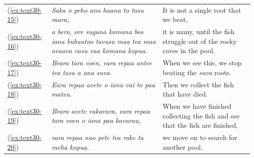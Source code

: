 \documentclass[output=paper]{langscibook}
\begin{document}
\begin{xltabular}{\textwidth}{lXX}
	(\ref{ex:text30-15})&\textit{Saka o peho ana haana to tasu raara,}&It is not a single root that we beat,\\
	(\ref{ex:text30-16})&\textit{a bero, ore suguna komana beo iana bubuutoo tavusu maa tea maa avaava vasu vaa komana kopua.}&it is many, until the fish struggle out of the rocky caves in the pool.\\
	(\ref{ex:text30-17})&\textit{Beara tara voen, eara repaa antee tea tasu a ana suva.}&When we see this, we stop beating the \textit{suva} roots.\\
	(\ref{ex:text30-18})&\textit{Eara repaa avete o iana vai to paa mateu.}&Then we collect the fish that have died.\\
	(\ref{ex:text30-19})&\textit{Beara avete vakavara, eara repaa tara voen o iana paa kavarau,}&When we have finished collecting the fish and see that the fish are finished,\\
	(\ref{ex:text30-20})&\textit{eara repaa nao pete tea rake ta meha kopua.}&we move on to search for another pool.\\
\end{xltabular}
\end{document}
